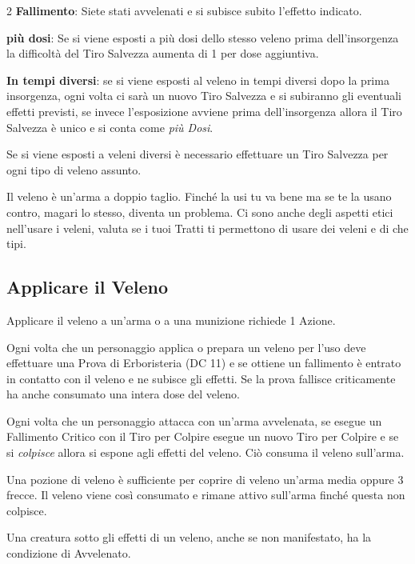 \begin{multicols}{2}
\textbf{Fallimento}: Siete stati avvelenati e si subisce subito l'effetto indicato.

\textbf{più dosi}: Se si viene esposti a più dosi dello stesso veleno prima dell'insorgenza la difficoltà del Tiro Salvezza aumenta di 1 per dose aggiuntiva.

\textbf{In tempi diversi}: se si viene esposti al veleno in tempi diversi dopo la prima insorgenza, ogni volta ci sarà un nuovo Tiro Salvezza e si subiranno gli eventuali effetti previsti, se invece l'esposizione avviene prima dell'insorgenza allora il Tiro Salvezza è unico e si conta come \emph{più Dosi}.

Se si viene esposti a veleni diversi è necessario effettuare un Tiro Salvezza per ogni tipo di veleno assunto.

\begin{giocatore}[Veleno ?]
{Il veleno è un'arma a doppio taglio. Finché la usi tu va bene ma se te la usano contro, magari lo stesso, diventa un problema. Ci sono anche degli aspetti etici nell'usare i veleni, valuta se i tuoi Tratti ti permettono di usare dei veleni e di che tipi.}\end{giocatore}

\subsection{Applicare il Veleno}\label{applicareveleno}

Applicare il veleno a un'arma o a una munizione richiede 1 Azione.

Ogni volta che un personaggio applica o prepara un veleno per l'uso deve effettuare una Prova di Erboristeria (DC 11) e se ottiene un fallimento è entrato in contatto con il veleno e ne subisce gli effetti. Se la prova fallisce criticamente ha anche consumato una intera dose del veleno.

Ogni volta che un personaggio attacca con un'arma avvelenata, se esegue un Fallimento Critico con il Tiro per Colpire esegue un nuovo Tiro per Colpire e se si \emph{colpisce} allora si espone agli effetti del veleno. Ciò consuma il veleno sull'arma.

Una pozione di veleno è sufficiente per coprire di veleno un'arma media oppure 3 frecce. Il veleno viene così consumato e rimane attivo sull'arma finché questa non colpisce.

Una creatura sotto gli effetti di un veleno, anche se non manifestato, ha la condizione di Avvelenato.


\end{multicols}
